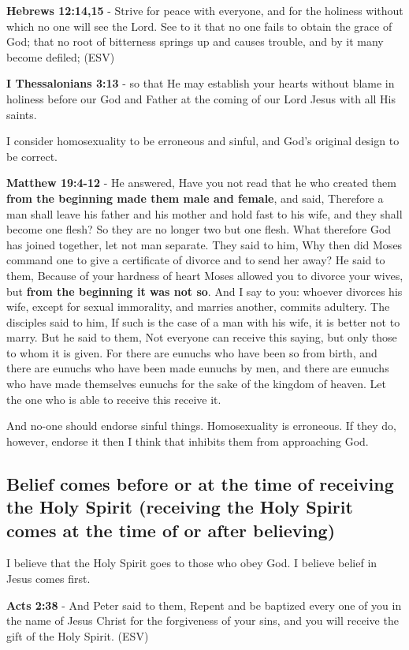 \documentclass[11pt]{article}
\begin{document}
\textbf{Hebrews 12:14,15} -  Strive for peace with everyone, and for the holiness without which no one will see the Lord.  See to it that no one fails to obtain the grace of God; that no root of bitterness springs up and causes trouble, and by it many become defiled;  (ESV)

\textbf{I Thessalonians 3:13} - so that He may establish your hearts without blame in holiness before our God and Father at the coming of our Lord Jesus with all His saints.

I consider homosexuality to be erroneous and sinful, and God's original design to be correct.

\textbf{Matthew 19:4-12} - He answered, Have you not read that he who created them \textbf{from the beginning made them male and female}, and said, Therefore a man shall leave his father and his mother and hold fast to his wife, and they shall become one flesh?  So they are no longer two but one flesh. What therefore God has joined together, let not man separate.  They said to him, Why then did Moses command one to give a certificate of divorce and to send her away?  He said to them, Because of your hardness of heart Moses allowed you to divorce your wives, but \textbf{from the beginning it was not so}.  And I say to you: whoever divorces his wife, except for sexual immorality, and marries another, commits adultery.  The disciples said to him, If such is the case of a man with his wife, it is better not to marry.  But he said to them, Not everyone can receive this saying, but only those to whom it is given.  For there are eunuchs who have been so from birth, and there are eunuchs who have been made eunuchs by men, and there are eunuchs who have made themselves eunuchs for the sake of the kingdom of heaven. Let the one who is able to receive this receive it.

And no-one should endorse sinful things. Homosexuality is erroneous.
If they do, however, endorse it then I think that inhibits them from approaching God.

\subsection{Belief comes before or at the time of receiving the Holy Spirit (receiving the Holy Spirit comes at the time of or after believing)}
\label{sec:org2c9e905}
I believe that the Holy Spirit goes to those who obey God. I believe belief in Jesus comes first.

\textbf{Acts 2:38} - And Peter said to them, Repent and be baptized every one of you in the name of Jesus Christ for the forgiveness of your sins, and you will receive the gift of the Holy Spirit. (ESV)
\end{document}
